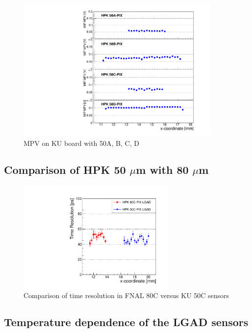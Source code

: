 \documentclass[preprint,1p]{elsarticle}
\begin{document}
\begin{figure}[htbp] 
\centering
\includegraphics[width=0.9\textwidth]{figs/KUBoard_HPK50ABCD/KUBoard_50ABCD_MPV.pdf} 
\caption{MPV on KU board with 50A, B, C, D } 
\label{fig:Sensors} 
\end{figure} 



\subsection{Comparison of HPK 50 $\mu$m with 80 $\mu$m}
\label{sec:HPK50vs80}

\begin{figure}[htbp] 
\centering
\includegraphics[width=0.7\textwidth]{figs/FNAL_TimeResolution_vs_X_HPK50CVs80C.pdf} 
\caption{Comparison of time resolution in FNAL 80C versus KU 50C sensors } 
\label{fig:Sensors} 
\end{figure} 


\subsection{Temperature dependence of the LGAD sensors}
\end{document}
